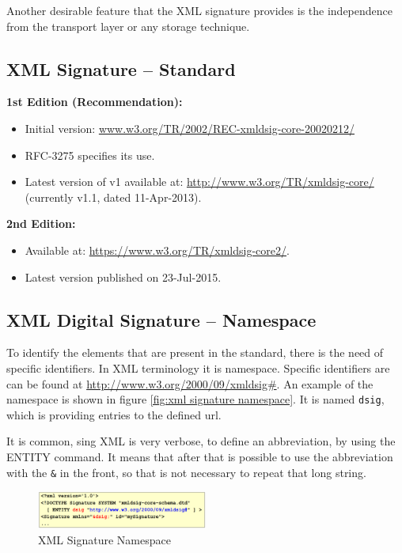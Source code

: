 Another desirable feature that the XML signature provides is the 
independence from the transport layer or any storage technique.

\subsection{XML Signature – Standard}

\textbf{1st Edition (Recommendation):}
\begin{itemize}
  \item Initial version:
    \url{www.w3.org/TR/2002/REC-xmldsig-core-20020212/}
  \item RFC-3275 specifies its use.
  \item Latest version of v1 available at:
    \url{http://www.w3.org/TR/xmldsig-core/} (currently v1.1, dated
    11-Apr-2013).
\end{itemize}

\textbf{2nd Edition:}
\begin{itemize}
  \item Available at: \url{https://www.w3.org/TR/xmldsig-core2/}.
  \item Latest version published on 23-Jul-2015.
\end{itemize}

\subsection{XML Digital Signature – Namespace}
To identify the elements that are present in the standard, there is
the need of specific identifiers. In XML terminology it is
namespace. Specific identifiers are can be found at
\url{http://www.w3.org/2000/09/xmldsig#}. 
An example of the namespace is shown in figure \ref{fig:xml
signature namespace}. It is named \texttt{dsig}, which is providing
entries to the defined url.

It is common, sing XML is very verbose, to define an abbreviation,
by using the ENTITY command. It means that after that is possible to
use the abbreviation with the \texttt{\&} in the front, so that is
not necessary to repeat that long string.


\begin{figure}[H]
  \centering
  \includegraphics[width=0.5\textwidth]{img/xmldsig namespace.png}
  \caption{XML Signature Namespace}
  \label{fig:xml signature namespace}
\end{figure}

